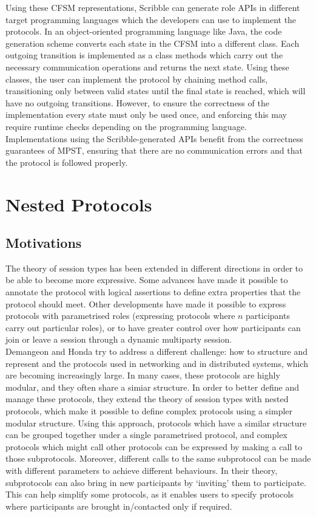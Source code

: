 \documentclass[12pt,twoside]{report}
\begin{document}
Using these CFSM representations, Scribble can generate role APIs in different target programming languages which the developers can use to implement the protocols. In an object-oriented programming language like Java, the code generation scheme converts each state in the CFSM into a different class. Each outgoing transition is implemented as a class methods which carry out the necessary communication operations and returns the next state. Using these classes, the user can implement the protocol by chaining method calls, transitioning only between valid states until the final state is reached, which will have no outgoing transitions. However, to ensure the correctness of the implementation every state must only be used once, and enforcing this may require runtime checks depending on the programming language.\\

Implementations using the Scribble-generated APIs benefit from the correctness guarantees of MPST, ensuring that there are no communication errors and that the protocol is followed properly.

\section{Nested Protocols}
\subsection{Motivations}
The theory of session types has been extended in different directions in order to be able to become more expressive. Some advances have made it possible to annotate the protocol with logical assertions to define extra properties that the protocol should meet\cite{logicaassertions}. Other developments have made it possible to express protocols with parametrised roles\cite{parametrictypes} (expressing protocols where $n$ participants carry out particular roles), or to have greater control over how participants can join or leave a session through a dynamic multiparty session\cite{multirolesessiontypes}. \\

Demangeon and Honda \cite{nestedprotocols} try to address a different challenge: how to structure and represent and the protocols used in networking and in distributed systems, which are becoming increasingly large. In many cases, these protocols are highly modular, and they often share a simiar structure. In order to better define and manage these protocols, they extend the theory of session types with nested protocols, which make it possible to define complex protocols using a simpler modular structure. Using this approach, protocols which have a similar structure can be grouped together under a single parametrised protocol, and complex protocols which might call other protocols can be expressed by making a call to those subprotocols. Moreover, different calls to the same subprotocol can be made with different parameters to achieve different behaviours. In their theory, subprotocols can also bring in new participants by `inviting' them to participate. This can help simplify some protocols, as it enables users to specify protocols where participants are brought in/contacted only if required.
\end{document}
